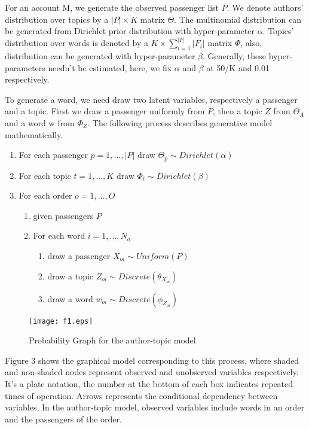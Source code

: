 \documentclass{sig-alternate-05-2015}
\begin{document}
For an account M, we generate the observed passenger list $P$. We denote authors' distribution over topics by a $|P| \times K$ matrix $\Theta$. The multinomial distribution can be generated from Dirichlet prior distribution with hyper-parameter $\alpha$. Topics' distribution over words is denoted by a $K \times \sum_{i=1}^{|F|}|F_i| $  matrix $\Phi$, also, distribution can be generated with hyper-parameter $\beta$. Generally, these hyper-parameters needn't be estimated, here, we fix $\alpha$ and $\beta$ at 50/K and 0.01 respectively. \par

To generate a word, we need draw two latent variables, respectively a passenger and a topic. First we draw a passenger uniformly from $P$, then a topic $Z$ from $\Theta_A$ and a word w from $\Phi_Z$. The following process describes generative model mathematically.\par

\begin{enumerate}
\item For each passenger $p=1,\dots,|P|$ draw $\Theta_p \sim Dirichlet(\alpha)$
\item For each topic $t=1,\dots,K$ draw $\Phi_t \sim Dirichlet(\beta)$
\item For each order $o=1,\dots,O$
       \begin{enumerate}[fullwidth,itemindent=1em,label=(\alph*)]
       \item given passengers $P$
       \item For each word $i=1,\dots, N_o$
              \begin{enumerate}[fullwidth,itemindent=2em,label=(\roman*)]
              \item draw a passenger $X_{oi} \sim Uniform(P)$
              \item draw a topic $Z_{oi} \sim Discrete(\theta_{X_{oi}})$
              \item draw a word $w_{oi} \sim Discrete(\phi_{Z_{oi}})$
              \end{enumerate}
       \end{enumerate}
\end{enumerate}
\begin{figure}[!hbt]
\centering
\texttt{[image: f1.eps]}
\caption{Probability Graph for the author-topic model}
\label{fig:Prob}
\end{figure}\par
Figure 3 shows the graphical model corresponding to this process, where shaded and non-shaded nodes represent observed and unobserved variables respectively. It's a plate notation, the number at the bottom of each box indicates repeated times of operation. Arrows represents the conditional dependency between variables. In the author-topic model, observed variables include words in an order and the passengers of the order.
\end{document}

